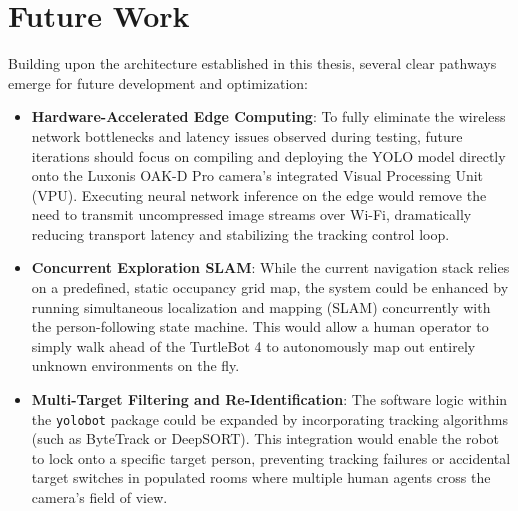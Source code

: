 \section{Future Work}
Building upon the architecture established in this thesis, several clear pathways emerge for future development and optimization:

\begin{itemize}
	\item \textbf{Hardware-Accelerated Edge Computing}: To fully eliminate the wireless network bottlenecks and latency issues observed during testing, future iterations should focus on compiling and deploying the YOLO model directly onto the Luxonis OAK-D Pro camera's integrated Visual Processing Unit (VPU). Executing neural network inference on the edge would remove the need to transmit uncompressed image streams over Wi-Fi, dramatically reducing transport latency and stabilizing the tracking control loop.
	\item \textbf{Concurrent Exploration SLAM}: While the current navigation stack relies on a predefined, static occupancy grid map, the system could be enhanced by running simultaneous localization and mapping (SLAM) concurrently with the person-following state machine. This would allow a human operator to simply walk ahead of the TurtleBot 4 to autonomously map out entirely unknown environments on the fly.
	\item \textbf{Multi-Target Filtering and Re-Identification}: The software logic within the \texttt{yolobot} package could be expanded by incorporating tracking algorithms (such as ByteTrack or DeepSORT). This integration would enable the robot to lock onto a specific target person, preventing tracking failures or accidental target switches in populated rooms where multiple human agents cross the camera's field of view.
\end{itemize}
